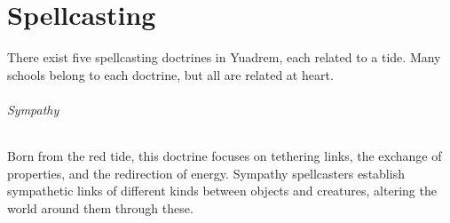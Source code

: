 \chapter{Spellcasting} \label{ch::spellcasting}
There exist five spellcasting doctrines in Yuadrem, each related to a tide.
Many schools belong to each doctrine, but all are related at heart.

\subparagraph{Sympathy} %
    Born from the red tide, this doctrine focuses on tethering links, the exchange of properties, and the redirection of energy.
    Sympathy spellcasters establish sympathetic links of different kinds between objects and creatures, altering the world around them through these.






